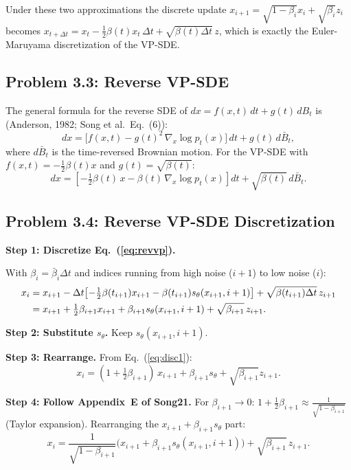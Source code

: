\documentclass[11pt]{article}
\begin{document}
Under these two approximations the discrete update $x_{i+1}=\sqrt{1-\beta_i}x_i+\sqrt{\beta_i}z_i$ becomes $x_{t+\Delta t} = x_t - \tfrac{1}{2}\beta(t)x_t\,\Delta t + \sqrt{\beta(t)\Delta t}\,z$, which is exactly the Euler-Maruyama discretization of the VP-SDE.

\subsection{Problem 3.3: Reverse VP-SDE}

The general formula for the reverse SDE of $dx=f(x,t)\,dt+g(t)\,dB_t$ is
(Anderson, 1982; Song et al.\ Eq.~(6)):
\[
dx = \bigl[f(x,t) - g(t)^2\,\nabla_x\log p_t(x)\bigr]\,dt + g(t)\,d\bar B_t,
\]
where $d\bar B_t$ is the time-reversed Brownian motion.  For the VP-SDE with
$f(x,t)=-\tfrac{1}{2}\beta(t)x$ and $g(t)=\sqrt{\beta(t)}$:
\begin{equation}\boxed{
dx = \left[-\tfrac{1}{2}\beta(t)\,x
           - \beta(t)\,\nabla_x\log p_t(x)\right]dt
     + \sqrt{\beta(t)}\,d\bar B_t.}
\label{eq:revvp}
\end{equation}

\subsection{Problem 3.4: Reverse VP-SDE Discretization}

\textbf{Step 1: Discretize Eq.~(\ref{eq:revvp}).}

With $\beta_i=\bar\beta_i\Delta t$ and indices running from high noise ($i+1$) to low noise ($i$):
\begin{align}
x_i &= x_{i+1} - \Delta t\!\left[-\tfrac{1}{2}\beta(t_{i+1})x_{i+1}
                                   -\beta(t_{i+1})s_\theta(x_{i+1},i+1)\right]
        + \sqrt{\beta(t_{i+1})\Delta t}\,z_{i+1} \notag\\
    &= x_{i+1} + \tfrac{1}{2}\beta_{i+1}x_{i+1}
       + \beta_{i+1}s_\theta(x_{i+1},i+1)
       + \sqrt{\beta_{i+1}}\,z_{i+1}. \label{eq:disc1}
\end{align}

\textbf{Step 2: Substitute $s_\theta$.} Keep $s_\theta(x_{i+1},i+1)$.

\textbf{Step 3: Rearrange.} From Eq.~(\ref{eq:disc1}):
\[
x_i = (1+\tfrac{1}{2}\beta_{i+1})\,x_{i+1} + \beta_{i+1}s_\theta + \sqrt{\beta_{i+1}}z_{i+1}.
\]

\textbf{Step 4: Follow Appendix~E of Song21.} For $\beta_{i+1}\to 0$:
$1+\tfrac{1}{2}\beta_{i+1}\approx\frac{1}{\sqrt{1-\beta_{i+1}}}$ (Taylor expansion).
Rearranging the $x_{i+1}+\beta_{i+1}s_\theta$ part:
\begin{equation}\boxed{
x_i = \frac{1}{\sqrt{1-\beta_{i+1}}}\bigl(x_{i+1}+\beta_{i+1}s_\theta(x_{i+1},i+1)\bigr)
      + \sqrt{\beta_{i+1}}\,z_{i+1}.}
\end{equation}
\end{document}

